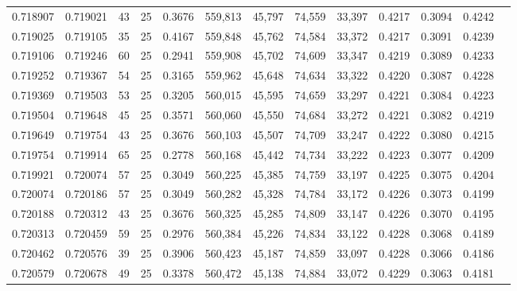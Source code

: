 \begin{tabular}{rrrrrrrrrrrrr}
0.718907 & 0.719021 &    43 &  25 &                                     0.3676 & 559,813 &  45,797 &  74,559 &  33,397 & 0.4217 & 0.3094 & 0.4242 \\
0.719025 & 0.719105 &    35 &  25 &                                     0.4167 & 559,848 &  45,762 &  74,584 &  33,372 & 0.4217 & 0.3091 & 0.4239 \\
0.719106 & 0.719246 &    60 &  25 &                                     0.2941 & 559,908 &  45,702 &  74,609 &  33,347 & 0.4219 & 0.3089 & 0.4233 \\
0.719252 & 0.719367 &    54 &  25 &                                     0.3165 & 559,962 &  45,648 &  74,634 &  33,322 & 0.4220 & 0.3087 & 0.4228 \\
0.719369 & 0.719503 &    53 &  25 &                                     0.3205 & 560,015 &  45,595 &  74,659 &  33,297 & 0.4221 & 0.3084 & 0.4223 \\
0.719504 & 0.719648 &    45 &  25 &                                     0.3571 & 560,060 &  45,550 &  74,684 &  33,272 & 0.4221 & 0.3082 & 0.4219 \\
0.719649 & 0.719754 &    43 &  25 &                                     0.3676 & 560,103 &  45,507 &  74,709 &  33,247 & 0.4222 & 0.3080 & 0.4215 \\
0.719754 & 0.719914 &    65 &  25 &                                     0.2778 & 560,168 &  45,442 &  74,734 &  33,222 & 0.4223 & 0.3077 & 0.4209 \\
0.719921 & 0.720074 &    57 &  25 &                                     0.3049 & 560,225 &  45,385 &  74,759 &  33,197 & 0.4225 & 0.3075 & 0.4204 \\
0.720074 & 0.720186 &    57 &  25 &                                     0.3049 & 560,282 &  45,328 &  74,784 &  33,172 & 0.4226 & 0.3073 & 0.4199 \\
0.720188 & 0.720312 &    43 &  25 &                                     0.3676 & 560,325 &  45,285 &  74,809 &  33,147 & 0.4226 & 0.3070 & 0.4195 \\
0.720313 & 0.720459 &    59 &  25 &                                     0.2976 & 560,384 &  45,226 &  74,834 &  33,122 & 0.4228 & 0.3068 & 0.4189 \\
0.720462 & 0.720576 &    39 &  25 &                                     0.3906 & 560,423 &  45,187 &  74,859 &  33,097 & 0.4228 & 0.3066 & 0.4186 \\
0.720579 & 0.720678 &    49 &  25 &                                     0.3378 & 560,472 &  45,138 &  74,884 &  33,072 & 0.4229 & 0.3063 & 0.4181 \\

\end{tabular}
